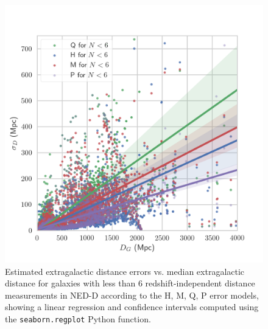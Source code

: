 \documentclass[a4paper,fleqn,usenatbib]{mnras}
\begin{document}
\begin{figure}
	\includegraphics[scale=0.7]{Nlow.png}
    \caption{Estimated extragalactic distance errors vs. median extragalactic distance for galaxies with less than 6 redshift-independent distance measurements in NED-D according to the H, M, Q, P error models, showing a linear regression and confidence intervals computed using the \texttt{seaborn.regplot} Python function.}
    \label{fig:Now}
\end{figure}
\end{document}

